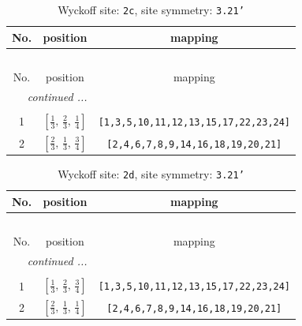 \documentclass[fleqn,8pt]{jsarticle}
\begin{document}
\renewcommand{\arraystretch}{1.2}
\begin{longtable}{ccc}
\caption{Wyckoff site: {\tt 2c}, site symmetry: {\tt 3.21'}}
 \\
 \hline \hline
No. & position & mapping \\ \hline \endfirsthead

\multicolumn{2}{l}{\tablename\ \thetable{}} \\
 \hline \hline
No. & position & mapping \\ \hline \endhead

 \hline \hline
\multicolumn{2}{r}{\footnotesize\it continued ...} \\ \endfoot

 \hline \hline
\multicolumn{2}{r}{} \\ \endlastfoot

1 & $\left[ \frac{1}{3},\, \frac{2}{3},\, \frac{1}{4} \right]$ & {\tt [1,3,5,10,11,12,13,15,17,22,23,24]} \\ \hline
2 & $\left[ \frac{2}{3},\, \frac{1}{3},\, \frac{3}{4} \right]$ & {\tt [2,4,6,7,8,9,14,16,18,19,20,21]} \\
\end{longtable}
\renewcommand{\arraystretch}{1.2}
\begin{longtable}{ccc}
\caption{Wyckoff site: {\tt 2d}, site symmetry: {\tt 3.21'}}
 \\
 \hline \hline
No. & position & mapping \\ \hline \endfirsthead

\multicolumn{2}{l}{\tablename\ \thetable{}} \\
 \hline \hline
No. & position & mapping \\ \hline \endhead

 \hline \hline
\multicolumn{2}{r}{\footnotesize\it continued ...} \\ \endfoot

 \hline \hline
\multicolumn{2}{r}{} \\ \endlastfoot

1 & $\left[ \frac{1}{3},\, \frac{2}{3},\, \frac{3}{4} \right]$ & {\tt [1,3,5,10,11,12,13,15,17,22,23,24]} \\ \hline
2 & $\left[ \frac{2}{3},\, \frac{1}{3},\, \frac{1}{4} \right]$ & {\tt [2,4,6,7,8,9,14,16,18,19,20,21]} \\
\end{longtable}
\renewcommand{\arraystretch}{1.2}
\end{document}
